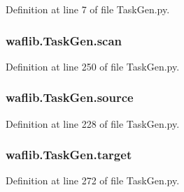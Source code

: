 Definition at line 7 of file Task\+Gen.\+py.

\subsubsection[{\texorpdfstring{scan}{scan}}]{\setlength{\rightskip}{0pt plus 5cm}waflib.\+Task\+Gen.\+scan}\hypertarget{namespacewaflib_1_1_task_gen_ab2e9d641671fe6c1322b12582dc6fbae}{}\label{namespacewaflib_1_1_task_gen_ab2e9d641671fe6c1322b12582dc6fbae}


Definition at line 250 of file Task\+Gen.\+py.

\subsubsection[{\texorpdfstring{source}{source}}]{\setlength{\rightskip}{0pt plus 5cm}waflib.\+Task\+Gen.\+source}\hypertarget{namespacewaflib_1_1_task_gen_a34bb2baa863bf0c5ab4742e22e6bc556}{}\label{namespacewaflib_1_1_task_gen_a34bb2baa863bf0c5ab4742e22e6bc556}


Definition at line 228 of file Task\+Gen.\+py.

\subsubsection[{\texorpdfstring{target}{target}}]{\setlength{\rightskip}{0pt plus 5cm}waflib.\+Task\+Gen.\+target}\hypertarget{namespacewaflib_1_1_task_gen_a26ab6f84969a42c0bb5ed5e31127257d}{}\label{namespacewaflib_1_1_task_gen_a26ab6f84969a42c0bb5ed5e31127257d}


Definition at line 272 of file Task\+Gen.\+py.

